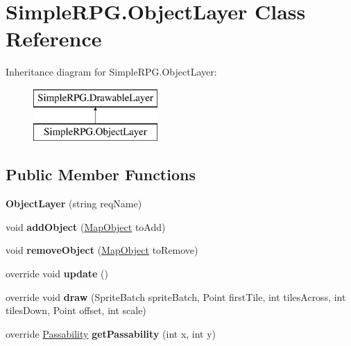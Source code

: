 \hypertarget{class_simple_r_p_g_1_1_object_layer}{\section{Simple\-R\-P\-G.\-Object\-Layer Class Reference}
\label{class_simple_r_p_g_1_1_object_layer}
}
Inheritance diagram for Simple\-R\-P\-G.\-Object\-Layer\-:\begin{figure}[H]
\begin{center}
\leavevmode
\includegraphics[height=2.000000cm]{class_simple_r_p_g_1_1_object_layer}
\end{center}
\end{figure}
\subsection*{Public Member Functions}
\begin{DoxyCompactItemize}
\item 
\hypertarget{class_simple_r_p_g_1_1_object_layer_a6f3e721aca78266fe74c2a0f3000645f}{{\bfseries Object\-Layer} (string req\-Name)}\label{class_simple_r_p_g_1_1_object_layer_a6f3e721aca78266fe74c2a0f3000645f}

\item 
\hypertarget{class_simple_r_p_g_1_1_object_layer_a799b067c1d7a5583cde3428a40c71ef2}{void {\bfseries add\-Object} (\hyperlink{class_simple_r_p_g_1_1_map_object}{Map\-Object} to\-Add)}\label{class_simple_r_p_g_1_1_object_layer_a799b067c1d7a5583cde3428a40c71ef2}

\item 
\hypertarget{class_simple_r_p_g_1_1_object_layer_acf7fff277839bac25f55a309925ed264}{void {\bfseries remove\-Object} (\hyperlink{class_simple_r_p_g_1_1_map_object}{Map\-Object} to\-Remove)}\label{class_simple_r_p_g_1_1_object_layer_acf7fff277839bac25f55a309925ed264}

\item 
\hypertarget{class_simple_r_p_g_1_1_object_layer_a1a74a83f0e799b85c0af1368dd26bc33}{override void {\bfseries update} ()}\label{class_simple_r_p_g_1_1_object_layer_a1a74a83f0e799b85c0af1368dd26bc33}

\item 
\hypertarget{class_simple_r_p_g_1_1_object_layer_a5c41bac76d7907dbcad3eb637bb74803}{override void {\bfseries draw} (Sprite\-Batch sprite\-Batch, Point first\-Tile, int tiles\-Across, int tiles\-Down, Point offset, int scale)}\label{class_simple_r_p_g_1_1_object_layer_a5c41bac76d7907dbcad3eb637bb74803}

\item 
\hypertarget{class_simple_r_p_g_1_1_object_layer_a9d519d9760d0be2acba494db6c60992d}{override \hyperlink{namespace_simple_r_p_g_a5f1ec21e7f4e36278a6cedd38c51e650}{Passability} {\bfseries get\-Passability} (int x, int y)}\label{class_simple_r_p_g_1_1_object_layer_a9d519d9760d0be2acba494db6c60992d}

\end{DoxyCompactItemize}
